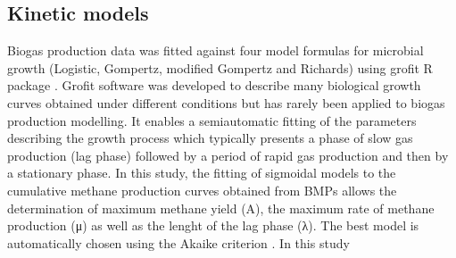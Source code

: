 \subsection{Kinetic models}
Biogas production data was fitted against four model formulas for microbial growth (Logistic, Gompertz, modified Gompertz and Richards) using grofit R package \cite{Kahm_2010}. Grofit software was developed to describe many biological growth curves obtained under different conditions but has rarely been applied to biogas production modelling. It enables a semiautomatic fitting of the parameters describing the growth process which typically presents a phase of slow gas production (lag phase) followed by a period of rapid gas production and then by a stationary phase. In this study, the fitting of sigmoidal models to the cumulative methane production curves obtained from BMPs allows the determination of maximum methane yield (A), the maximum rate of methane production (μ) as well as the lenght of the lag phase (λ). The best model is automatically chosen using the Akaike criterion \cite{Hasenbrink_2006}. In this study